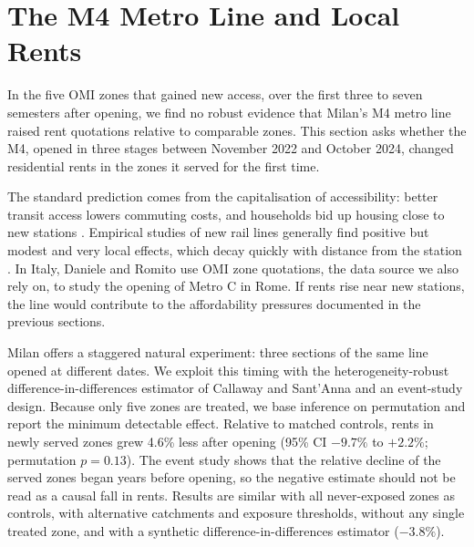 
\section*{The M4 Metro Line and Local Rents}

In the five OMI zones that gained new access, over the first three to seven semesters after opening, we find no robust evidence that Milan's M4 metro line raised rent quotations relative to comparable zones. This section asks whether the M4, opened in three stages between November 2022 and October 2024, changed residential rents in the zones it served for the first time.

The standard prediction comes from the capitalisation of accessibility: better transit access lowers commuting costs, and households bid up housing close to new stations \cite{alonso1964,gibbons2005}. Empirical studies of new rail lines generally find positive but modest and very local effects, which decay quickly with distance from the station \cite{billings2011}. In Italy, Daniele and Romito \cite{daniele2022} use OMI zone quotations, the data source we also rely on, to study the opening of Metro C in Rome. If rents rise near new stations, the line would contribute to the affordability pressures documented in the previous sections.

Milan offers a staggered natural experiment: three sections of the same line opened at different dates. We exploit this timing with the heterogeneity-robust difference-in-differences estimator of Callaway and Sant'Anna \cite{callaway2021} and an event-study design. Because only five zones are treated, we base inference on permutation and report the minimum detectable effect. Relative to matched controls, rents in newly served zones grew 4.6\% less after opening (95\% CI $-9.7\%$ to $+2.2\%$; permutation $p=0.13$). The event study shows that the relative decline of the served zones began years before opening, so the negative estimate should not be read as a causal fall in rents. Results are similar with all never-exposed zones as controls, with alternative catchments and exposure thresholds, without any single treated zone, and with a synthetic difference-in-differences estimator ($-3.8\%$).

